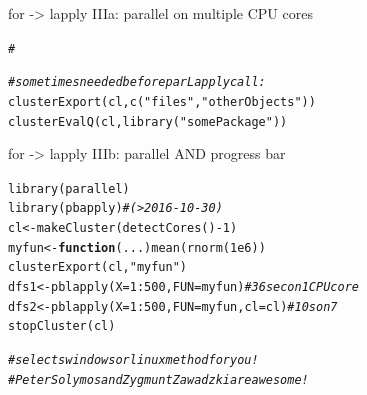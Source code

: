 \documentclass[xcolor=table,       handout,    xcolor=dvipsnames]{beamer}\usepackage[]{graphicx}\usepackage[]{color}
\makeatletter
\newcommand{\hlnum}[1]{\textcolor[rgb]{0,0,0}{#1}}
\newcommand{\hlstr}[1]{\textcolor[rgb]{0.545,0.137,0.137}{#1}}
\newcommand{\hlcom}[1]{\textcolor[rgb]{0,0.392,0}{\textit{#1}}}
\newcommand{\hlopt}[1]{\textcolor[rgb]{0,0,0}{#1}}
\newcommand{\hlstd}[1]{\textcolor[rgb]{0,0,0}{#1}}
\newcommand{\hlkwa}[1]{\textcolor[rgb]{1,0,0}{\textbf{#1}}}
\newcommand{\hlkwb}[1]{\textcolor[rgb]{0,0,0}{#1}}
\newcommand{\hlkwc}[1]{\textcolor[rgb]{1,0,1}{#1}}
\newcommand{\hlkwd}[1]{\textcolor[rgb]{0,0,1}{#1}}
\newenvironment{kframe}{%
 \def\at@end@of@kframe{}%
 \ifinner\ifhmode%
  \def\at@end@of@kframe{\end{minipage}}%
  \begin{minipage}{\columnwidth}%
 \fi\fi%
 \def\FrameCommand##1{\hskip\@totalleftmargin \hskip-\fboxsep
 \colorbox{shadecolor}{##1}\hskip-\fboxsep
     \hskip-\linewidth \hskip-\@totalleftmargin \hskip\columnwidth}%
 \MakeFramed {\advance\hsize-\width
   \@totalleftmargin\z@ \linewidth\hsize
   \@setminipage}}%
 {\par\unskip\endMakeFramed%
 \at@end@of@kframe}
\newenvironment{knitrout}{}{} %
\makeatother
\begin{document}
\begin{frame}[fragile]{for -> lapply IIIa: parallel on multiple CPU cores}
\begin{knitrout}
\begin{kframe}
\begin{alltt}
\hlcom{#}
\end{alltt}
\end{kframe}
\end{knitrout}
\pause \vspace{-2.6em}
\begin{knitrout}
\color{fgcolor}\begin{kframe}
\begin{alltt}
\hlcom{# sometimes needed before parLapply call:}
\hlkwd{clusterExport}\hlstd{(cl,} \hlkwd{c}\hlstd{(}\hlstr{"files"}\hlstd{,}\hlstr{"otherObjects"}\hlstd{))}
\hlkwd{clusterEvalQ}\hlstd{(cl,} \hlkwd{library}\hlstd{(}\hlstr{"somePackage"}\hlstd{))}
\end{alltt}
\end{kframe}
\end{knitrout}
\end{frame}


\begin{frame}[fragile]{for -> lapply IIIb: parallel AND progress bar}
\vspace{-1em}
\begin{knitrout}
\color{fgcolor}\begin{kframe}
\begin{alltt}
\hlkwd{library}\hlstd{(parallel)}
\hlkwd{library}\hlstd{(pbapply)} \hlcom{# (>2016-10-30)}
\hlstd{cl} \hlkwb{<-} \hlkwd{makeCluster}\hlstd{(} \hlkwd{detectCores}\hlstd{()}\hlopt{-}\hlnum{1} \hlstd{)}
\hlstd{myfun} \hlkwb{<-} \hlkwa{function}\hlstd{(}\hlkwc{...}\hlstd{)} \hlkwd{mean}\hlstd{(}\hlkwd{rnorm}\hlstd{(}\hlnum{1e6}\hlstd{))}
\hlkwd{clusterExport}\hlstd{(cl,} \hlstr{"myfun"}\hlstd{)}
\hlstd{dfs1} \hlkwb{<-} \hlkwd{pblapply}\hlstd{(}\hlkwc{X}\hlstd{=}\hlnum{1}\hlopt{:}\hlnum{500}\hlstd{,} \hlkwc{FUN}\hlstd{=myfun)} \hlcom{# 36 sec on 1 CPU core}
\hlstd{dfs2} \hlkwb{<-} \hlkwd{pblapply}\hlstd{(}\hlkwc{X}\hlstd{=}\hlnum{1}\hlopt{:}\hlnum{500}\hlstd{,} \hlkwc{FUN}\hlstd{=myfun,} \hlkwc{cl}\hlstd{=cl)} \hlcom{# 10 s on 7}
\hlkwd{stopCluster}\hlstd{(cl)}

\hlcom{# selects windows or linux method for you!}
\hlcom{# Peter Solymos and Zygmunt Zawadzki are awesome!}
\end{alltt}
\end{kframe}
\end{knitrout}
\end{frame}
\end{document}
